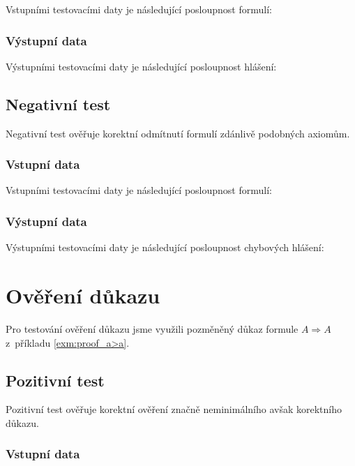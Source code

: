 \documentclass[thesis=B,czech,hidelinks]{thesis}[2012/06/26]
\begin{document}
Vstupními testovacími daty je následující posloupnost formulí:


\subsubsection{Výstupní data}

Výstupními testovacími daty je následující posloupnost hlášení:


\subsection{Negativní test}

Negativní test ověřuje korektní odmítnutí formulí zdánlivě podobných axiomům.

\subsubsection{Vstupní data}

Vstupními testovacími daty je následující posloupnost formulí:


\subsubsection{Výstupní data}

Výstupními testovacími daty je následující posloupnost chybových hlášení:


\section{Ověření důkazu}

Pro testování ověření důkazu jsme využili pozměněný důkaz formule $A \Rightarrow A$ z~příkladu \ref{exm:proof_a>a}.

\subsection{Pozitivní test}

Pozitivní test ověřuje korektní ověření značně neminimálního avšak korektního důkazu.

\subsubsection{Vstupní data}
\end{document}

